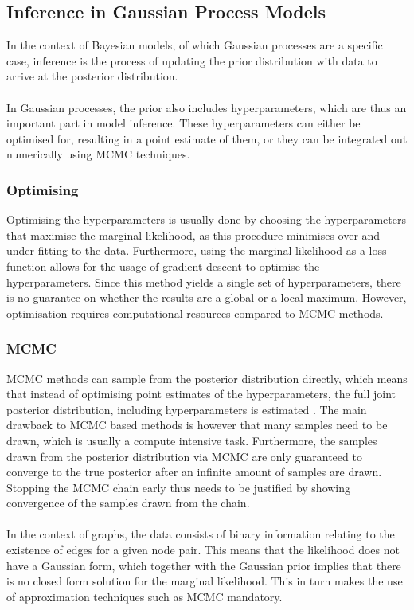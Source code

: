 \documentclass[11pt]{report} %
\begin{document}
\subsection{Inference in Gaussian Process Models}
In the context of Bayesian models, of which Gaussian processes are a specific case, inference is the process of updating the prior distribution with data to arrive at the posterior distribution.\\\\
In Gaussian processes, the prior also includes hyperparameters, which are thus an important part in model inference. 
These hyperparameters can either be optimised for, resulting in a point estimate of them, or they can be integrated out numerically using MCMC techniques. 
\subsubsection{Optimising}
Optimising the hyperparameters is usually done by choosing the hyperparameters that maximise the marginal likelihood, as this procedure minimises over and under fitting to the data. Furthermore, using the marginal likelihood as a loss function allows for the usage of gradient descent to optimise the hyperparameters. Since this method yields a single set of hyperparameters, there is no guarantee on whether the results are a global or a local maximum. However, optimisation requires computational resources compared to MCMC methods.
\subsubsection{MCMC}
MCMC methods can sample from the posterior distribution directly, which means that instead of optimising point estimates of the hyperparameters, the full joint posterior distribution, including hyperparameters is estimated \cite{candela2005, nickisch2008}.
The main drawback to MCMC based methods is however that many samples need to be drawn, which is usually a compute intensive task. 
Furthermore, the samples drawn from the posterior distribution via MCMC are only guaranteed to converge to the true posterior after an infinite amount of samples are drawn.
Stopping the MCMC chain early thus needs to be justified by showing convergence of the samples drawn from the chain.\\\\
In the context of graphs, the data consists of binary information relating to the existence of edges for a given node pair. This means that the likelihood does not have a Gaussian form, which together with the Gaussian prior implies that there is no closed form solution for the marginal likelihood. This in turn makes the use of approximation techniques such as MCMC mandatory.
\end{document}
